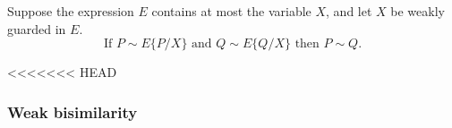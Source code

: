 \begin{theorem}
Suppose the expression $E$ contains at most the variable $X$, and let $X$ be weakly
guarded in $E$.
\begin{equation}
\text{If } P \sim E\{P/X\} \text{ and } Q \sim E\{Q/X\} \text{ then }
P \sim Q.
\end{equation}
\begin{alltt}
\HOLTokenTurnstile{}   \HOLSymConst{\HOLTokenConj{}}  \HOLSymConst{\HOLTokenStrongEQ}   \HOLSymConst{\HOLTokenConj{}}  \HOLSymConst{\HOLTokenStrongEQ}   \HOLSymConst{\HOLTokenImp{}}  \HOLSymConst{\HOLTokenStrongEQ} 
\end{alltt}
\end{theorem}

<<<<<<< HEAD
\subsubsection{Weak bisimilarity}

